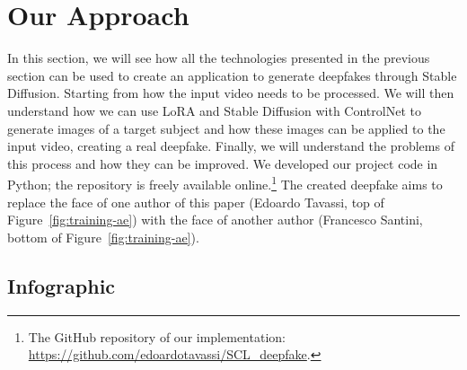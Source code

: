 \documentclass[sn-mathphys,Numbered]{sn-jnl}
\theoremstyle{thmstyleone}%
\theoremstyle{thmstyletwo}%
\theoremstyle{thmstylethree}%
\begin{document}
\section{Our Approach} \label{ch:project}

In this section, we will see how all the technologies presented in the previous  section can be used to create an application to generate deepfakes through Stable Diffusion.  Starting from how the input video needs to be processed.  We will then understand how we can use LoRA and Stable Diffusion with ControlNet to  generate images of a target subject and how these images can be applied to the input video, 
creating a real deepfake.  Finally, we will understand the problems of this process and how they can be improved. We developed our project code in Python; the repository is freely available online.\footnote{The GitHub repository of our  implementation: \url{https://github.com/edoardotavassi/SCL_deepfake}.} The created deepfake aims to replace the face of one author of this paper (Edoardo Tavassi, top of  Figure~\ref{fig:training-ae}) with the face of another author (Francesco Santini, bottom of  Figure~\ref{fig:training-ae}).



\subsection{Infographic}\label{sec:project_info}
\end{document}
